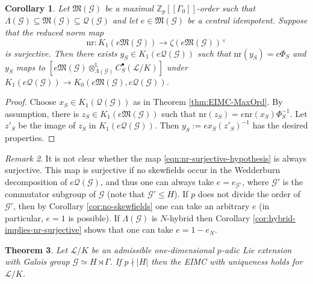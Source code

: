 \documentclass[12pt]{amsart}
\theoremstyle{plain}
\newtheorem{theorem}{Theorem}[section]
\newtheorem{corollary}[theorem]{Corollary}
\theoremstyle{remark}
\newtheorem{remark}[theorem]{Remark}
\theoremstyle{definition}
\numberwithin{equation}{section}
\begin{document}
\begin{corollary} \label{cor:EIMC-MaxOrd}
Let $\mathfrak{M}(\mathcal{G})$ be a maximal ${\mathbb{Z}}_{p}[[\Gamma_{0}]]$-order such that 
$\Lambda(\mathcal{G}) \subseteq \mathfrak{M}(\mathcal{G}) \subseteq \mathcal{Q}(\mathcal{G})$
and let $e \in \mathfrak{M}(\mathcal{G})$ be a central idempotent. Suppose that the reduced norm map
\begin{equation} \label{eqn:nr-surjective-hypothesis}
{\mathrm{nr}}: K_{1}(e \mathfrak{M}(\mathcal{G})) \longrightarrow \zeta(e \mathfrak{M}(\mathcal{G})){^{\times}}
\end{equation}
is surjective.
Then there exists $y_{S} \in K_{1}(e \mathcal{Q}(\mathcal{G}))$ such that ${\mathrm{nr}}(y_{S}) = e \Phi_{S}$
and $y_{S}$ maps to $[e \mathfrak{M}(\mathcal{G}) \otimes^{\mathbb{L}}_{\Lambda(\mathcal{G})} C_{S}^{\bullet}(\mathcal{L}/K)]$ under
$K_{1}(e \mathcal{Q}(\mathcal{G})) \rightarrow K_{0}(e \mathfrak{M}(\mathcal{G}), e \mathcal{Q}(\mathcal{G}))$.
\end{corollary}

\begin{proof}
Choose $x_{S} \in K_{1}(\mathcal{Q}(\mathcal{G}))$ as in Theorem \ref{thm:EIMC-MaxOrd}. By assumption, there is
$z_{S} \in K_{1}(e \mathfrak{M}(\mathcal{G}))$ such that ${\mathrm{nr}}(z_{S}) = e {\mathrm{nr}}(x_{S}) \Phi_{S}^{-1}$.
Let $z'_{S}$ be the image of $z_{S}$ in $K_{1}(e \mathcal{Q}(\mathcal{G}))$.
 Then $y_{S} := e x_{S} (z'_{S})^{-1}$ has the desired properties.
\end{proof}

\begin{remark}\label{rmk:nr-surjective}
It is not clear whether the map \eqref{eqn:nr-surjective-hypothesis} is always surjective. This map is surjective if no skewfields
occur in the Wedderburn decomposition of $e \mathcal{Q}(\mathcal{G})$, and thus one can always take $e = e_{\mathcal{G}'}$,
where $\mathcal{G'}$ is the commutator subgroup of $\mathcal{G}$ (note that $\mathcal{G}' \leq H$).
If $p$ does not divide the order of $\mathcal{G}'$, then by Corollary \ref{cor:no-skewfields}
one can take an arbitrary $e$ (in particular, $e=1$ is possible).
If $\Lambda(\mathcal{G})$ is $N$-hybrid then Corollary \ref{cor:hybrid-implies-nr-surjective} shows that one can take $e=1-e_{N}$.
\end{remark}

\begin{theorem}\label{thm:EIMC-for-p-not-dividing-ordH}
Let $\mathcal{L}/K$ be an admissible one-dimensional $p$-adic Lie extension with Galois group $\mathcal{G} \simeq  H \rtimes \Gamma$.
If $p \nmid |H|$ then the EIMC with uniqueness holds for $\mathcal{L}/K$.
\end{theorem}
\end{document}
